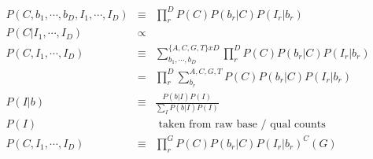 \documentclass{article}
\begin{document}
\begin{eqnarray}
P(C,b_1,\cdots,b_D,I_1,\cdots,I_D) & \equiv & \prod_r^D P(C)P(b_r|C)P(I_r|b_r) \\[6ex]
P(C|I_1, \cdots, I_D) & \propto \\
P(C,I_1,\cdots,I_D) & \equiv & \sum_{b_1,\cdots,b_D}^{\{A,C,G,T\}xD } \prod_r^D P(C)P(b_r|C)P(I_r|b_r) \nonumber \\
& = & \prod_r^D \sum_{b_r}^{A,C,G,T} P(C)P(b_r|C)P(I_r|b_r) \nonumber \\[6ex]
P(I|b) & \equiv & \frac{P(b|I)P(I)}{\sum_I P(b|I)P(I)} \\[6ex]
P(I) & & \mbox { taken from raw base / qual counts } \\[6ex]
P(C,I_1,\cdots,I_D) & \equiv & \prod_r^G {P(C)P(b_r|C)P(I_r|b_r)}^C(G) \\[6ex]
\end{eqnarray}
\end{document}
